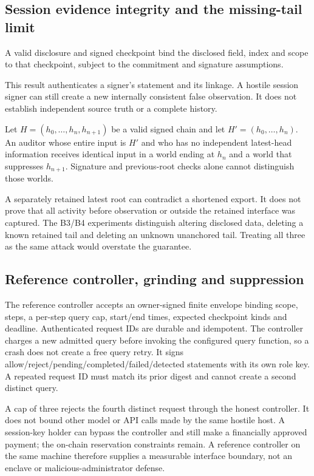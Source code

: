 \subsection{Session evidence integrity and the missing-tail limit}
\begin{property}
A valid disclosure and signed checkpoint bind the disclosed field, index and scope to that checkpoint, subject to the commitment and signature assumptions.
\end{property}
This result authenticates a signer's statement and its linkage. A hostile session signer can still create a new internally consistent false observation. It does not establish independent source truth or a complete history.

\begin{observation}\label{obs:tail}
Let $H=(h_0,\ldots,h_n,h_{n+1})$ be a valid signed chain and let $H'=(h_0,\ldots,h_n)$. An auditor whose entire input is $H'$ and who has no independent latest-head information receives identical input in a world ending at $h_n$ and a world that suppresses $h_{n+1}$. Signature and previous-root checks alone cannot distinguish those worlds.
\end{observation}
A separately retained latest root can contradict a shortened export. It does not prove that all activity before observation or outside the retained interface was captured. The B3/B4 experiments distinguish altering disclosed data, deleting a known retained tail and deleting an unknown unanchored tail. Treating all three as the same attack would overstate the guarantee.

\subsection{Reference controller, grinding and suppression}
The reference controller accepts an owner-signed finite envelope binding scope, steps, a per-step query cap, start/end times, expected checkpoint kinds and deadline. Authenticated request IDs are durable and idempotent. The controller charges a new admitted query before invoking the configured query function, so a crash does not create a free query retry. It signs allow/reject/pending/completed/failed/detected statements with its own role key. A repeated request ID must match its prior digest and cannot create a second distinct query.

A cap of three rejects the fourth distinct request through the honest controller. It does not bound other model or API calls made by the same hostile host. A session-key holder can bypass the controller and still make a financially approved payment; the on-chain reservation constraints remain. A reference controller on the same machine therefore supplies a measurable interface boundary, not an enclave or malicious-administrator defense.

